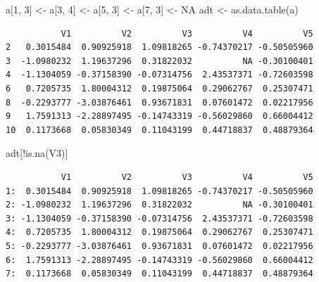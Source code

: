 \documentclass[
]{book}
\newenvironment{Shaded}{\begin{snugshade}}{\end{snugshade}}
\newcommand{\ConstantTok}[1]{\textcolor[rgb]{0.00,0.00,0.00}{#1}}
\newcommand{\DecValTok}[1]{\textcolor[rgb]{0.00,0.00,0.81}{#1}}
\newcommand{\FunctionTok}[1]{\textcolor[rgb]{0.00,0.00,0.00}{#1}}
\newcommand{\NormalTok}[1]{#1}
\newcommand{\OtherTok}[1]{\textcolor[rgb]{0.56,0.35,0.01}{#1}}
\newcommand{\SpecialCharTok}[1]{\textcolor[rgb]{0.00,0.00,0.00}{#1}}
\begin{document}
\begin{Shaded}
\begin{Highlighting}[]
\NormalTok{a[}\DecValTok{1}\NormalTok{, }\DecValTok{3}\NormalTok{] }\OtherTok{\textless{}{-}}\NormalTok{ a[}\DecValTok{3}\NormalTok{, }\DecValTok{4}\NormalTok{] }\OtherTok{\textless{}{-}}\NormalTok{ a[}\DecValTok{5}\NormalTok{, }\DecValTok{3}\NormalTok{] }\OtherTok{\textless{}{-}}\NormalTok{ a[}\DecValTok{7}\NormalTok{, }\DecValTok{3}\NormalTok{] }\OtherTok{\textless{}{-}} \ConstantTok{NA}
\NormalTok{adt }\OtherTok{\textless{}{-}} \FunctionTok{as.data.table}\NormalTok{(a)}
\end{Highlighting}
\end{Shaded}

\begin{Shaded}
\end{Shaded}

\begin{verbatim}
           V1          V2          V3          V4          V5
2   0.3015484  0.90925918  1.09818265 -0.74370217 -0.50505960
3  -1.0980232  1.19637296  0.31822032          NA -0.30100401
4  -1.1304059 -0.37158390 -0.07314756  2.43537371 -0.72603598
6   0.7205735  1.80004312  0.19875064  0.29062767  0.25307471
8  -0.2293777 -3.03876461  0.93671831  0.07601472  0.02217956
9   1.7591313 -2.28897495 -0.14743319 -0.56029860  0.66004412
10  0.1173668  0.05830349  0.11043199  0.44718837  0.48879364
\end{verbatim}

\begin{Shaded}
\begin{Highlighting}[]
\NormalTok{adt[}\SpecialCharTok{!}\FunctionTok{is.na}\NormalTok{(V3)]}
\end{Highlighting}
\end{Shaded}

\begin{verbatim}
           V1          V2          V3          V4          V5
1:  0.3015484  0.90925918  1.09818265 -0.74370217 -0.50505960
2: -1.0980232  1.19637296  0.31822032          NA -0.30100401
3: -1.1304059 -0.37158390 -0.07314756  2.43537371 -0.72603598
4:  0.7205735  1.80004312  0.19875064  0.29062767  0.25307471
5: -0.2293777 -3.03876461  0.93671831  0.07601472  0.02217956
6:  1.7591313 -2.28897495 -0.14743319 -0.56029860  0.66004412
7:  0.1173668  0.05830349  0.11043199  0.44718837  0.48879364
\end{verbatim}
\end{document}
